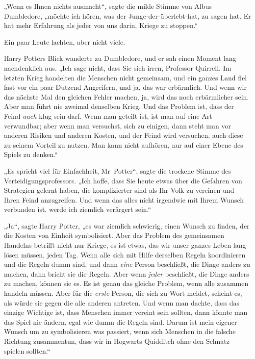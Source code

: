 {„Wenn es Ihnen nichts ausmacht“, sagte die milde Stimme von Albus Dumbledore, „möchte ich hören, was der Junge-der-überlebt-hat, zu sagen hat. Er hat mehr Erfahrung als jeder von uns darin, Kriege zu stoppen.“

Ein paar Leute lachten, aber nicht viele.

Harry Potters Blick wanderte zu Dumbledore, und er sah einen Moment lang nachdenklich aus. „Ich sage nicht, dass Sie sich irren, Professor Quirrell. Im letzten Krieg handelten die Menschen nicht gemeinsam, und ein ganzes Land fiel fast vor ein paar Dutzend Angreifern, und ja, das war erbärmlich. Und wenn wir das nächste Mal den gleichen Fehler machen, ja, wird das noch erbärmlicher sein. Aber man führt nie zweimal denselben Krieg. Und das Problem ist, dass der Feind \emph{auch} klug sein darf. Wenn man geteilt ist, ist man auf eine Art verwundbar; aber wenn man versuchst, sich zu einigen, dann steht man vor anderen Risiken und anderen Kosten, und der Feind wird versuchen, auch diese zu seinem Vorteil zu nutzen. Man kann nicht aufhören, nur auf einer Ebene des Spiels zu denken.“

„Es spricht viel für Einfachheit, Mr~Potter“, sagte die trockene Stimme des Verteidigungsprofessors. „Ich hoffe, dass Sie heute etwas über die Gefahren von Strategien gelernt haben, die komplizierter sind als Ihr Volk zu vereinen und Ihren Feind anzugreifen. Und wenn das alles nicht irgendwie mit Ihrem Wunsch verbunden ist, werde ich ziemlich verärgert sein.“

„Ja“, sagte Harry Potter, „es war ziemlich schwierig, einen Wunsch zu finden, der die Kosten von Einheit symbolisiert. Aber das Problem des gemeinsamen Handelns betrifft nicht nur Kriege, es ist etwas, das wir unser ganzes Leben lang lösen müssen, jeden Tag. Wenn alle sich mit Hilfe derselben Regeln koordinieren und die Regeln dumm sind, und dann \emph{eine} Person beschließt, die Dinge anders zu machen, dann bricht sie die Regeln. Aber wenn \emph{jeder} beschließt, die Dinge anders zu machen, können sie es. Es ist genau das gleiche Problem, wenn alle zusammen handeln müssen. Aber für die \emph{erste} Person, die sich zu Wort meldet, scheint es, als würde sie gegen die alle anderen antreten. Und wenn man dachte, dass das einzige Wichtige ist, dass Menschen immer vereint sein sollten, dann könnte man das Spiel nie ändern, egal wie dumm die Regeln sind. Darum ist mein eigener Wunsch um zu symbolisieren was passiert, wenn sich Menschen in die falsche Richtung zusammentun, dass wir in Hogwarts Quidditch ohne den Schnatz spielen sollten.“

}
